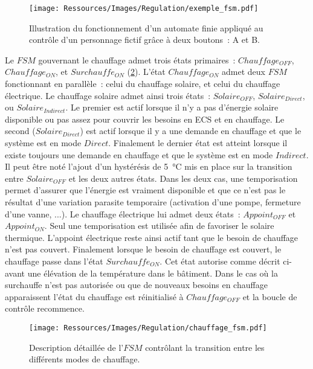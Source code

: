 \begin{figure}
    \begin{center}
        \texttt{[image: Ressources/Images/Regulation/exemple\_fsm.pdf]}
    \end{center}
    \caption{Illustration du fonctionnement d’un automate finie appliqué au contrôle
             d’un personnage fictif grâce à deux boutons~: A et B.
             \label{fig:automate_fini}}
\end{figure}

Le $FSM$ gouvernant le chauffage admet trois états primaires~: $Chauffage_{OFF}$,
$Chauffage_{ON}$, et $Surchauffe_{ON}$ (\ref{fig:automate_chauffage}). L’état
$Chauffage_{ON}$ admet deux $FSM$ fonctionnant en parallèle~: celui du chauffage
solaire, et celui du chauffage électrique. Le chauffage solaire admet ainsi trois états~:
$Solaire_{OFF}$, $Solaire_{Direct}$, ou $Solaire_{Indirect}$. Le premier est actif lorsque
il n’y a pas d’énergie solaire disponible ou pas assez pour couvrir les besoins en ECS et
en chauffage. Le second ($Solaire_{Direct}$) est actif lorsque il y a une demande en
chauffage et que le système est en mode $Direct$. Finalement le dernier état est atteint
lorsque il existe toujours une demande en chauffage et que le système est en mode
$Indirect$.
Il peut être noté l’ajout d’un hystérésis de \SI{5}{\celsius} mis en place sur la
transition entre $Solaire_{OFF}$ et les deux autres états. Dans les deux cas, une
temporisation permet d’assurer que l’énergie est vraiment disponible et que ce n’est pas
le résultat d’une variation parasite temporaire (activation d’une pompe, fermeture d’une
vanne, ...). Le chauffage électrique lui admet deux états~: $Appoint_{OFF}$ et
$Appoint_{ON}$. Seul une temporisation est utilisée afin de favoriser le solaire thermique.
L’appoint électrique reste ainsi actif tant que le besoin de chauffage n’est pas couvert. Finalement
lorsque le besoin de chauffage est couvert, le chauffage passe dans l’état
$Surchauffe_{ON}$. Cet état autorise comme décrit ci-avant une élévation de la température
dans le bâtiment. Dans le cas où la surchauffe n’est pas autorisée ou que de nouveaux
besoins en chauffage apparaissent l’état du chauffage est réinitialisé à $Chauffage_{OFF}$
et la boucle de contrôle recommence.

\begin{figure}
    \begin{center}
        \texttt{[image: Ressources/Images/Regulation/chauffage\_fsm.pdf]}
    \end{center}
    \caption{Description détaillée de l’$FSM$ contrôlant la transition entre
             les différents modes de chauffage.
             \label{fig:automate_chauffage}}
\end{figure}


